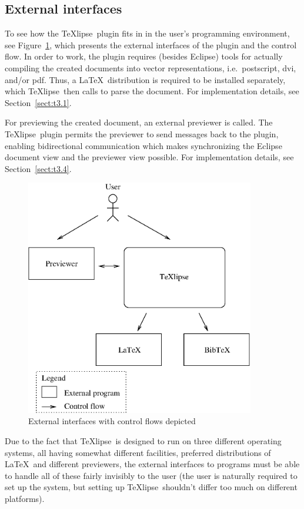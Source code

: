 \documentclass[a4paper,11pt,twoside]{article}
\newcommand{\texlipse}{\TeX lipse}
\begin{document}
\subsection{External interfaces}

To see how the \texlipse\ plugin fits in in the user's programming
environment, see Figure~\ref{fig:ext}, which presents the external
interfaces of the plugin and the control flow. In order to work, the
plugin requires (besides Eclipse) tools for actually compiling the
created documents into vector representations, i.e.\ postscript, dvi,
and/or pdf. Thus, a \LaTeX\ distribution is required to be installed
separately, which \texlipse\ then calls to parse the document.
For implementation details, see Section~\ref{sect:t3.1}.

For previewing the created document, an external previewer is called.
The \texlipse\ plugin permits the previewer to send messages back to
the plugin, enabling bidirectional communication which makes
synchronizing the Eclipse document view and the previewer view
possible. For implementation details, see Section~\ref{sect:t3.4}.

\begin{figure}[!htp]
\begin{center}
\includegraphics[width=10cm]{images/external}
\caption{External interfaces with control flows depicted}
\label{fig:ext}
\end{center}
\end{figure} 

Due to the fact that \texlipse\ is designed to run on three different
operating systems, all having somewhat different facilities, preferred
distributions of \LaTeX\ and different previewers, the external
interfaces to programs must be able to handle all of these fairly
invisibly to the user (the user is naturally required to set up the
system, but setting up \texlipse\ shouldn't differ too much on different
platforms).
\end{document}
